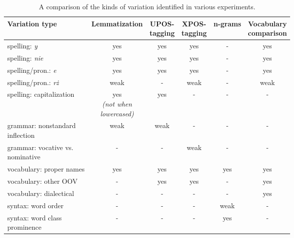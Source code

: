 \renewcommand{\arraystretch}{1.25}
\begin{table}[H]
\begin{center}
\begin{tabular}{|l|ccccc|}
\hline \bf Variation type & \bf Lemmatization & \bf \makecell[c]{UPOS-\\tagging} & \bf \makecell[c]{XPOS-\\tagging} & \bf n-grams & \bf \makecell[c]{Vocabulary \\ comparison} \\ \hline
spelling: \textit{y} & yes & yes & yes & - & yes \\
spelling: \textit{nie} & yes & yes & yes & - & yes \\
spelling/pron.: \textit{e} & yes & yes & yes & - & yes \\
spelling/pron.: \textit{rż} & weak & - & weak & - & weak \\
spelling: capitalization & \makecell[c]{yes \\ \textit{(not when} \\ \textit{lowercased)}} & yes & - & - & - \\
\makecell[l]{grammar: nonstandard \\ inflection}  & weak & weak & - & - & - \\
\makecell[l]{grammar: vocative vs. \\ nominative}  & - & - & weak & - & - \\
vocabulary: proper names  & yes & yes & yes & yes & yes \\
vocabulary: other OOV & - & yes & yes & - & yes \\
vocabulary: dialectical & - & - & - & - & yes \\
syntax: word order & - & - & - & weak & - \\
\makecell[l]{syntax: word class \\ prominence} & - & - & - & yes & - \\
\hline
\end{tabular}
\caption{\label{table:results-comparison} A comparison of the kinds of variation identified in various experiments.}
\end{center}
\end{table}

